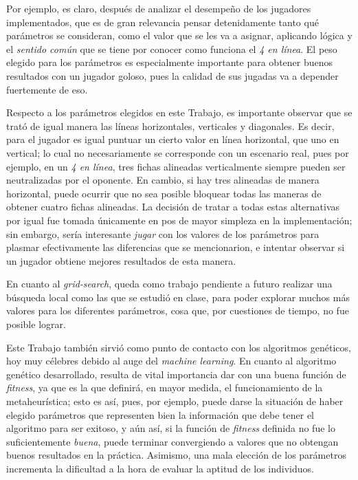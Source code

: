 \documentclass[12pt,a4paper]{article}
\begin{document}
Por ejemplo, es claro, después de analizar el desempeño de los jugadores implementados, que es de gran relevancia pensar detenidamente tanto qué parámetros se consideran, como el valor que se les va a asignar, aplicando lógica y el \textit{sentido común} que se tiene por conocer como funciona el \textit{4 en línea}. El peso elegido para los parámetros es especialmente importante para obtener buenos resultados con un jugador goloso, pues la calidad de sus jugadas va a depender fuertemente de eso.

Respecto a los parámetros elegidos en este Trabajo, es importante observar que se trató de igual manera las líneas horizontales, verticales y diagonales. Es decir, para el jugador es igual puntuar un cierto valor en línea horizontal, que uno en vertical; lo cual no necesariamente se corresponde con un escenario real, pues por ejemplo, en un \textit{4 en línea}, tres fichas alineadas verticalmente siempre pueden ser neutralizadas por el oponente. En cambio, si hay tres alineadas de manera horizontal, puede ocurrir que no sea posible bloquear todas las maneras de obtener cuatro fichas alineadas. La decisión de tratar a todas estas alternativas por igual fue tomada únicamente en pos de mayor simpleza en la implementación; sin embargo, sería interesante \textit{jugar} con los valores de los parámetros para plasmar efectivamente las diferencias que se mencionarion, e intentar observar si un jugador obtiene mejores resultados de esta manera.

En cuanto al \textit{grid-search}, queda como trabajo pendiente a futuro realizar una búsqueda local como las que se estudió en clase, para poder explorar muchos más valores para los diferentes parámetros, cosa que, por cuestiones de tiempo, no fue posible lograr.

Este Trabajo también sirvió como punto de contacto con los algoritmos genéticos, hoy muy célebres debido al auge del \textit{machine learning}. En cuanto al algoritmo genético desarrollado, resulta de vital importancia dar con una buena función de \textit{fitness}, ya que es la que definirá, en mayor medida, el funcionamiento de la metaheurística; esto es así, pues, por ejemplo, puede darse la situación de haber elegido parámetros que representen bien la información que debe tener el algoritmo para ser exitoso, y aún así, si la función de \textit{fitness} definida no fue lo suficientemente \textit{buena}, puede terminar convergiendo a valores que no obtengan buenos resultados en la práctica. Asimismo, una mala elección de los parámetros incrementa la dificultad a la hora de evaluar la aptitud de los individuos.
\end{document}
